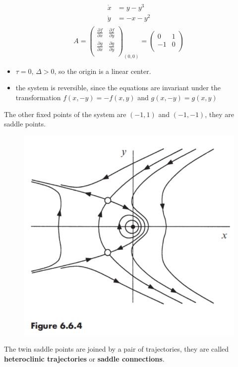 \documentclass[9pt,aspectratio=43,mathserif,table]{beamer}
\begin{document}
\begin{frame}
	$$
	\begin{aligned}
		\dot{x}&=y-y^3\\
		\dot{y}&=-x-y^2\\
	\end{aligned}
	$$
	$$
	A=\left( \begin{matrix}
		\frac{\partial f}{\partial x}&		\frac{\partial f}{\partial y}\\
		\frac{\partial g}{\partial x}&		\frac{\partial g}{\partial y}\\
	\end{matrix} \right) _{\left( 0,0 \right)}=\left( \begin{matrix}
		0&		1\\
		-1&		0\\
	\end{matrix} \right) 
	$$
	\begin{itemize}
		\item $\tau = 0$, $\Delta>0$, so the origin is a linear center.
		\item the system is reversible, since the equations are invariant under the transformation $f ( x, -y ) = -f ( x, y )$ and $g ( x, -y ) = g ( x, y )$
	\end{itemize}
\end{frame}

\begin{frame}
	The other fixed points of the system are $(-1, 1)$ and $(-1, -1)$, they are saddle points.
	\begin{figure}
		\centering
		\includegraphics[width=0.5\linewidth]{fig664.jpg}
	\end{figure}
	The twin saddle points are joined by a pair of trajectories, they are called \textbf{heteroclinic trajectories} or \textbf{saddle connections}.
\end{frame}
\end{document}
